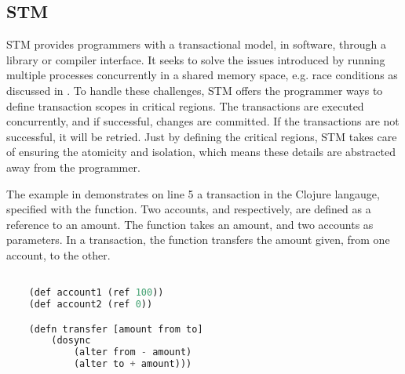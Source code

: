 \subsection{\acl{STM}}\label{sec:stm_stm}
\ac{STM} provides programmers with a transactional model, in software, through a library or compiler interface\cite{herlihy2011tm}. It seeks to solve the issues introduced by running multiple processes concurrently in a shared memory space, e.g. race conditions as discussed in . To handle these challenges, \ac{STM} offers the programmer ways to define transaction scopes in critical regions. The transactions are executed concurrently, and if successful, changes are committed. If the transactions are not successful, it will be retried. Just by defining the critical regions, \ac{STM} takes care of ensuring the atomicity and isolation, which means these details are abstracted away from the programmer. 

The example in  demonstrates on line 5 a transaction in the Clojure langauge, specified with the  function. Two accounts,  and  respectively, are defined as a reference to an amount. The function  takes an amount, and two accounts as parameters. In a transaction, the function transfers the amount given, from one account, to the other.

\begin{lstlisting}[label=lst:stmexample,
  caption={STM in Clojure},
  language=Lisp,  
  showspaces=false,
  showtabs=false,
  breaklines=true,
  showstringspaces=false,
  breakatwhitespace=true,
  commentstyle=\color{greencomments},
  keywordstyle=\color{bluekeywords},
  stringstyle=\color{redstrings}]  % Start your code-block

	(def account1 (ref 100))
	(def account2 (ref 0))

	(defn transfer [amount from to]
    	(dosync
    		(alter from - amount)
    		(alter to + amount)))
       
\end{lstlisting}

